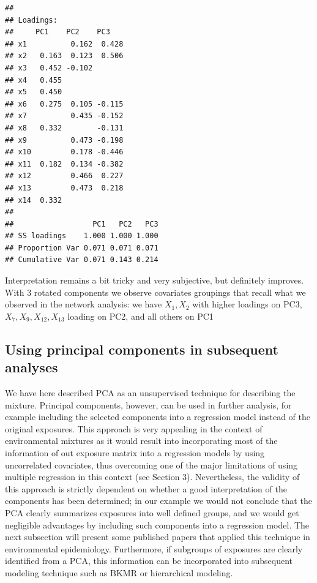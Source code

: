 \documentclass[
]{book}
\begin{document}
\begin{verbatim}
## 
## Loadings:
##     PC1    PC2    PC3   
## x1          0.162  0.428
## x2   0.163  0.123  0.506
## x3   0.452 -0.102       
## x4   0.455              
## x5   0.450              
## x6   0.275  0.105 -0.115
## x7          0.435 -0.152
## x8   0.332        -0.131
## x9          0.473 -0.198
## x10         0.178 -0.446
## x11  0.182  0.134 -0.382
## x12         0.466  0.227
## x13         0.473  0.218
## x14  0.332              
## 
##                  PC1   PC2   PC3
## SS loadings    1.000 1.000 1.000
## Proportion Var 0.071 0.071 0.071
## Cumulative Var 0.071 0.143 0.214
\end{verbatim}

Interpretation remains a bit tricky and very subjective, but definitely improves. With 3 rotated components we observe covariates groupings that recall what we observed in the network analysis: we have \(X_1, X_2\) with higher loadings on PC3, \(X_7, X_9, X_{12}, X_{13}\) loading on PC2, and all others on PC1

\hypertarget{using-principal-components-in-subsequent-analyses}{%
\subsection{Using principal components in subsequent analyses}\label{using-principal-components-in-subsequent-analyses}}

We have here described PCA as an unsupervised technique for describing the mixture. Principal components, however, can be used in further analysis, for example including the selected components into a regression model instead of the original exposures. This approach is very appealing in the context of environmental mixtures as it would result into incorporating most of the information of out exposure matrix into a regression models by using uncorrelated covariates, thus overcoming one of the major limitations of using multiple regression in this context (see Section 3). Nevertheless, the validity of this approach is strictly dependent on whether a good interpretation of the components has been determined; in our example we would not conclude that the PCA clearly summarizes exposures into well defined groups, and we would get negligible advantages by including such components into a regression model. The next subsection will present some published papers that applied this technique in environmental epidemiology. Furthermore, if subgroups of exposures are clearly identified from a PCA, this information can be incorporated into subsequent modeling technique such as BKMR or hierarchical modeling.
\end{document}
